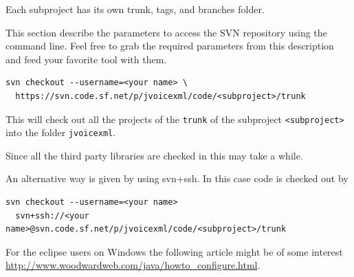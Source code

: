 \documentclass[11pt,a4paper]{article}
\begin{document}
Each subproject has its own trunk, tags, and branches folder.

This section describe the parameters to access the SVN repository 
using the command line. Feel free to grab the required parameters from
this description and feed your favorite tool with them.

\begin{lstlisting}
svn checkout --username=<your name> \
  https://svn.code.sf.net/p/jvoicexml/code/<subproject>/trunk
\end{lstlisting}

This will check out all the projects of the \texttt{trunk} of
the subproject \texttt{<subproject>} into the folder \texttt{jvoicexml}.

Since all the third party libraries are checked in this may
take a while.

An alternative way is given by using svn+ssh. In this case code is checked out
by
\begin{lstlisting}
svn checkout --username=<your name>
  svn+ssh://<your name>@svn.code.sf.net/p/jvoicexml/code/<subproject>/trunk
\end{lstlisting}

For the eclipse users on Windows the following article might be of some interest
\url{http://www.woodwardweb.com/java/howto_configure.html}. 
\end{document}
